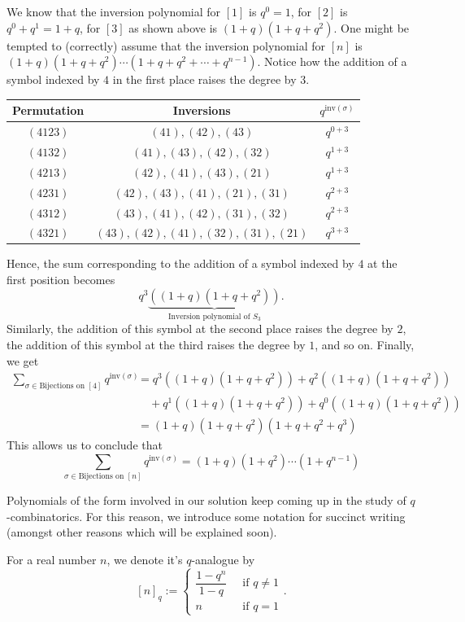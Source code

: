 \begin{solution}
We know that the inversion polynomial for $[1]$ is $q^0=1$, for $[2]$ is $q^0+q^1=1+q$, for $[3]$ as shown above is $(1+q)(1+q+q^2)$. One might be tempted to (correctly) assume that the inversion polynomial for $[n]$ is $(1+q)(1+q+q^2)\cdots(1+q+q^2+\cdots+q^{n-1})$. Notice how the addition of a symbol indexed by $4$ in the first place raises the degree by $3$.
\begin{center}
\begin{tabular}{|c|c|c|}
\hline
\textbf{Permutation} & \textbf{Inversions} & $q^{\text{inv}(\sigma)}$ \\
\hline
$(4123)$ &$(41),(42),(43)$ & $q^{0+3}$ \\
\hline
$(4132)$ & $(41),(43),(42),(32)$ & $q^{1+3}$ \\
\hline 
$(4213)$ & $(42),(41),(43),(21)$ & $q^{1+3}$ \\
\hline
$(4231)$ & $(42),(43),(41),(21),(31)$ & $q^{2+3}$ \\
\hline
$(4312)$ & $(43),(41),(42),(31),(32)$ & $q^{2+3}$\\
\hline
$(4321)$ & $(43),(42),(41),(32),(31),(21)$ & $q^{3+3}$\\
\hline
\end{tabular}
\end{center}
Hence, the sum corresponding to the addition of a symbol indexed by $4$ at the first position becomes \[q^3\underbrace{((1+q)(1+q+q^2))}_{\text{Inversion polynomial of } S_3}.\] Similarly, the addition of this symbol at the second place raises the degree by $2$, the addition of this symbol at the third raises the degree by $1$, and so on. Finally, we get 
\begin{align*}
	\sum_{\sigma\in \text{Bijections on }[4]} q^{\text{inv}(\sigma)}&=q^3((1+q)(1+q+q^2))+ q^2((1+q)(1+q+q^2))\\ &\quad +q^1((1+q)(1+q+q^2))+q^0((1+q)(1+q+q^2)) \\
						   &=(1+q)(1+q+q^2)(1+q+q^2+q^3)
\end{align*}
This allows us to conclude that \[
\sum_{\sigma\in \text{Bijections on }[n]}q^{\text{inv}(\sigma)} = (1+q)(1+q^2)\cdots (1+q^{n-1})
\]
\end{solution}
Polynomials of the form involved in our solution keep coming up in the study of $q$-combinatorics. For this reason, we introduce some notation for succinct writing (amongst other reasons which will be explained soon).
\begin{definition}
For a real number $n$, we denote it's $q$-analogue by \[[n]_q:=\begin{cases}\dfrac{1-q^n}{1-q} \ &\text{ if } q\neq 1 \\ n \ &\text{ if } q=1 \end{cases}.\]
\end{definition}
